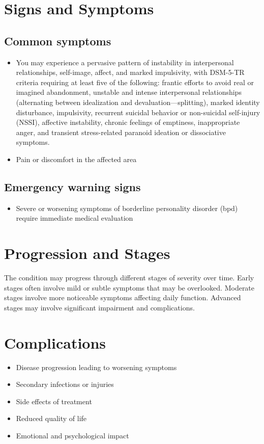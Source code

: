 \section{Signs and Symptoms}

\subsection{Common symptoms}
\begin{itemize}[noitemsep]
  \item You may experience a pervasive pattern of instability in interpersonal relationships, self-image, affect, and marked impulsivity, with DSM-5-TR criteria requiring at least five of the following: frantic efforts to avoid real or imagined abandonment, unstable and intense interpersonal relationships (alternating between idealization and devaluation---splitting), marked identity disturbance, impulsivity, recurrent suicidal behavior or non-suicidal self-injury (NSSI), affective instability, chronic feelings of emptiness, inappropriate anger, and transient stress-related paranoid ideation or dissociative symptoms.
  \item Pain or discomfort in the affected area
  \end{itemize}

\subsection{Emergency warning signs}
\begin{itemize}[noitemsep]
  \item Severe or worsening symptoms of borderline personality disorder (bpd) require immediate medical evaluation
\end{itemize}
\section{Progression and Stages}
The condition may progress through different stages of severity over time. Early stages often involve mild or subtle symptoms that may be overlooked. Moderate stages involve more noticeable symptoms affecting daily function. Advanced stages may involve significant impairment and complications.
\section{Complications}
\begin{itemize}[noitemsep]
  \item Disease progression leading to worsening symptoms
  \item Secondary infections or injuries
  \item Side effects of treatment
  \item Reduced quality of life
  \item Emotional and psychological impact
\end{itemize}
